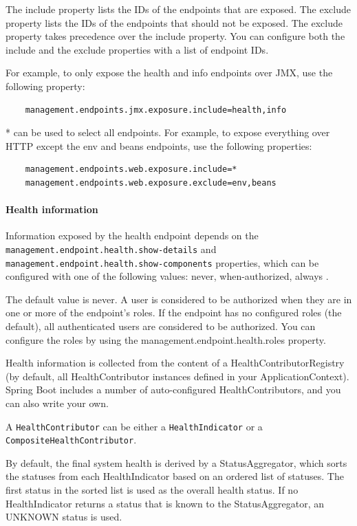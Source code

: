 \documentclass{scrartcl}
\begin{document}
The include property lists the IDs of the endpoints that are exposed. The exclude property lists the IDs of the endpoints that should not be exposed. The exclude property takes precedence over the include property. You can configure both the include and the exclude properties with a list of endpoint IDs.

For example, to only expose the health and info endpoints over JMX, use the following property:

\begin{lstlisting}
    management.endpoints.jmx.exposure.include=health,info
\end{lstlisting}

* can be used to select all endpoints. For example, to expose everything over HTTP except the env and beans endpoints, use the following properties:

\begin{lstlisting}
    management.endpoints.web.exposure.include=*
    management.endpoints.web.exposure.exclude=env,beans

\end{lstlisting}

\paragraph{Health information}

Information exposed by the health endpoint depends on the \lstinline|management.endpoint.health.show-details| and \lstinline|management.endpoint.health.show-components| properties, which can be configured with one of the following values: never, when-authorized, always
.

The default value is never. A user is considered to be authorized when they are in one or more of the endpoint’s roles. If the endpoint has no configured roles (the default), all authenticated users are considered to be authorized. You can configure the roles by using the management.endpoint.health.roles property.

Health information is collected from the content of a HealthContributorRegistry (by default, all HealthContributor instances defined in your ApplicationContext). Spring Boot includes a number of auto-configured HealthContributors, and you can also write your own.

A \lstinline|HealthContributor| can be either a \lstinline|HealthIndicator| or a \lstinline|CompositeHealthContributor|.

By default, the final system health is derived by a StatusAggregator, which sorts the statuses from each HealthIndicator based on an ordered list of statuses. The first status in the sorted list is used as the overall health status. If no HealthIndicator returns a status that is known to the StatusAggregator, an UNKNOWN status is used.
\end{document}
